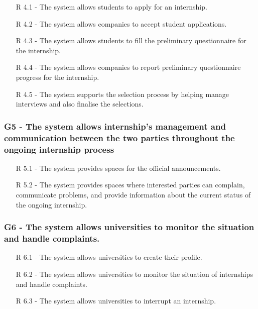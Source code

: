 \begin{itemize}
    \item [R 4.1] - The system allows students to apply for an internship.
    \item [R 4.2] - The system allows companies to accept student applications.
    \item [R 4.3] - The system allows students to fill the preliminary questionnaire for the internship.
    \item [R 4.4] - The system allows companies to report preliminary questionnaire progress for the internship.
    \item [R 4.5] - The system supports the selection process by helping manage interviews and also finalise the selections.
\end{itemize}
\hspace*{15mm}

\subsubsection{G5 - The system allows internship's management and communication between the two parties
throughout the ongoing internship process}
\hspace*{15mm}
\begin{itemize}
    \item [R 5.1] - The system provides spaces for the official announcements.
    \item [R 5.2] - The system provides spaces where interested parties can complain,
    communicate problems, and provide information about the current status of the ongoing internship.
\end{itemize}
\hspace*{15mm}

\subsubsection{G6 - The system allows universities to monitor the situation and handle complaints.}
\hspace*{15mm}
\begin{itemize}
    \item [R 6.1] - The system allows universities to create their profile.
    \item [R 6.2] - The system allows universities to monitor the situation of internships and handle complaints.
    \item [R 6.3] - The system allows universities to interrupt an internship.
\end{itemize}
\hspace*{15mm}

